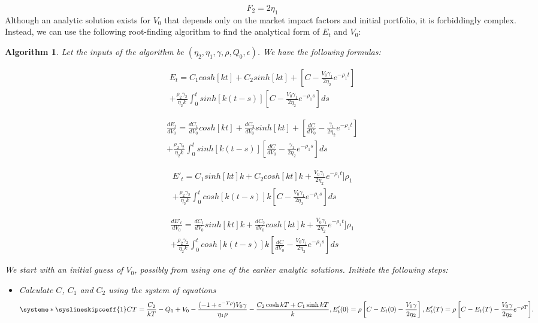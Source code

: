 \documentclass{article}
\newtheorem{algorithm}{Algorithm}
\begin{document}
\[
  F_2 = 2 \eta_1
\]
Although an analytic solution exists for $V_0$ that depends only on the market impact factors and initial portfolio, it is forbiddingly complex. Instead, we can use the following root-finding algorithm to find the analytical form of $E_t$ and $V_0$:
\begin{algorithm}
  Let the inputs of the algorithm be $(\eta_2,\eta_1,\gamma,\rho,Q_0,\epsilon)$. We have the following formulas:

  \[
    \begin{split}
      E_t = C_1 cosh[k t]+ C_2  sinh[k t] + [C- \frac{V_0 \gamma_1}{2 \eta_2} e^{-\rho_1 t}] \\
      + \frac{\rho_2 \gamma_2}{\eta_2 k}\int_0^t sinh[k(t-s)] [C- \frac{V_0 \gamma_1}{2 \eta_2} e^{-\rho_1 s}]ds
    \end{split}
  \]

  \[
    \begin{aligned}
      \frac{dE_t}{dV_0} = \frac{dC_1}{dV_0} cosh[k t]+ \frac{dC_2}{dV_0}  sinh[k t] + [\frac{dC}{dV_0} - \frac{\gamma_1}{2 \eta_2} e^{-\rho_1 t}] \\
      + \frac{\rho_2 \gamma_2}{\eta_2 k}\int_0^t sinh[k(t-s)] [\frac{dC}{dV_0}- \frac{\gamma_1}{2 \eta_2} e^{-\rho_1 s}]ds
    \end{aligned}
  \]

  \[
    \begin{split}
      E'_t = C_1 sinh[k t] k+ C_2 cosh[k t] k + \frac{V_0 \gamma_1}{2 \eta_2} e^{-\rho_1 t}] \rho_1 \\
      + \frac{\rho_2 \gamma_2}{\eta_2 k}\int_0^t cosh[k(t-s)] k [C- \frac{V_0 \gamma_1}{2 \eta_2} e^{-\rho_1 s}]ds
    \end{split}
  \]


  \[
    \begin{split}
      \frac{dE'_t}{dV_0}  = \frac{dC_1}{dV_0} sinh[k t] k + \frac{dC_2}{dV_0} cosh[k t] k + \frac{V_0 \gamma_1}{2 \eta_2} e^{-\rho_1 t}] \rho_1 \\
      + \frac{\rho_2 \gamma_2}{\eta_2 k}\int_0^t cosh[k(t-s)] k [ \frac{dC}{dV_0} - \frac{V_0 \gamma_1}{2 \eta_2} e^{-\rho_1 s}]ds
    \end{split}
  \]

  We start with an initial guess of $V_0$, possibly from using one of the earlier analytic solutions. Initiate the following steps:

  \begin{itemize}
    \item Calculate $C$, $C_1$ and $C_2$ using the system of equations
          \[
            \systeme*{
              \syslineskipcoeff{1}
              CT = \frac{C_2}{kT} - Q_0 + V_0 - \frac{(-1 + e^{-T \rho}) V_0 \gamma}{\eta_1 \rho} -  \frac{C_2 \cosh{kT} + C_1 \sinh{kT}}{k},
              E_t'(0) = \rho \left[C - E_t(0) - \frac{V_0 \gamma}{2 \eta_2} \right],
              E_t'(T) = \rho \left[C - E_t(T) - \frac{V_0 \gamma}{2 \eta_2} e^{-\rho T}\right]
            }.
          \]


\end{itemize}
\end{algorithm}
\end{document}
